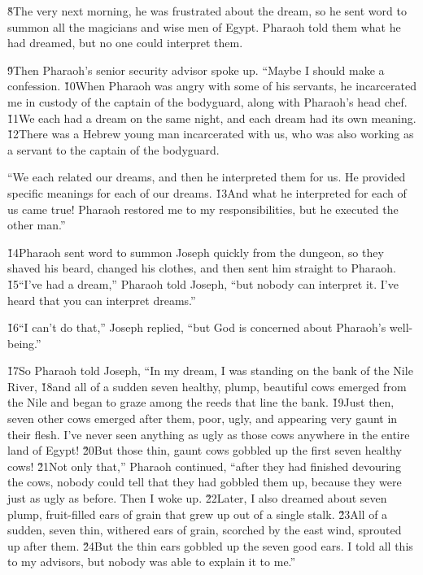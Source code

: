 \v{8}The very next morning, he was frustrated about the dream, so he sent word to summon all the magicians and wise men of Egypt. Pharaoh told them what he had dreamed, but no one could interpret them.

\v{9}Then Pharaoh's senior security advisor spoke up. ``Maybe I should make a confession. \v{10}When Pharaoh was angry with some of his servants, he incarcerated me in custody of the captain of the bodyguard, along with Pharaoh's head chef. \v{11}We each had a dream on the same night, and each dream had its own meaning. \v{12}There was a Hebrew young man incarcerated with us, who was also working as a servant to the captain of the bodyguard.

``We each related our dreams, and then he interpreted them for us. He provided specific meanings for each of our dreams. \v{13}And what he interpreted for each of us came true! Pharaoh restored me to my responsibilities, but he executed the other man.''

\v{14}Pharaoh sent word to summon Joseph quickly from the dungeon, so they shaved his beard, changed his clothes, and then sent him straight to Pharaoh. \v{15}``I've had a dream,'' Pharaoh told Joseph, ``but nobody can interpret it. I've heard that you can interpret dreams.''

\v{16}``I can't do that,'' Joseph replied, ``but God is concerned about Pharaoh's well-being.''

\v{17}So Pharaoh told Joseph, ``In my dream, I was standing on the bank of the Nile River, \v{18}and all of a sudden seven healthy, plump, beautiful cows emerged from the Nile and began to graze among the reeds that line the bank. \v{19}Just then, seven other cows emerged after them, poor, ugly, and appearing very gaunt in their flesh. I've never seen anything as ugly as those cows anywhere in the entire land of Egypt! \v{20}But those thin, gaunt cows gobbled up the first seven healthy cows! \v{21}Not only that,'' Pharaoh continued, ``after they had finished devouring the cows, nobody could tell that they had gobbled them up, because they were just as ugly as before. Then I woke up. \v{22}Later, I also dreamed about seven plump, fruit-filled ears of grain that grew up out of a single stalk. \v{23}All of a sudden, seven thin, withered ears of grain, scorched by the east wind, sprouted up after them. \v{24}But the thin ears gobbled up the seven good ears. I told all this to my advisors, but nobody was able to explain it to me.''

